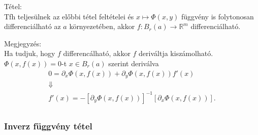 \documentclass[12pt,a4paper]{scrartcl}
\newenvironment{tetel}{}{}
\newenvironment{megjegyzes}{}{}
\begin{document}
\begin{tetel}

Tétel:\\
Tfh teljesülnek az előbbi tétel feltételei és
\(\left. x\mapsto\Phi\left( {x,y} \right) \right.\) függvény is
folytonosan differenciálható az \(a\) környezetében, akkor
\(\left. f:B_{r}\left( a \right)\rightarrow{\mathbb{R}}^{m} \right.\)
differenciálható.

\end{tetel}

\begin{megjegyzes}

Megjegyzés:\\
Ha tudjuk, hogy \(f\) differencálható, akkor \(f\) deriváltja
kiszámolható. \(\Phi\left( {x,f\left( x \right)} \right) = 0\)-t
\(x \in B_{r}\left( a \right)\) szerint deriválva \[\begin{gathered}
  0 = {\partial _x}\Phi \left( {x,f\left( x \right)} \right) + {\partial _y}\Phi \left( {x,f\left( x \right)} \right)f'\left( x \right) \\ 
   \Downarrow  \\ 
  f'\left( x \right) =  - {\left[ {{\partial _y}\Phi \left( {x,f\left( x \right)} \right)} \right]^{ - 1}}\left[ {{\partial _x}\Phi \left( {x,f\left( x \right)} \right)} \right]. \\ 
\end{gathered} \]

\end{megjegyzes}

\hypertarget{inverz-fuggveny-tetel}{%
\subsubsection{Inverz függvény tétel}\label{inverz-fuggveny-tetel}}
\end{document}
